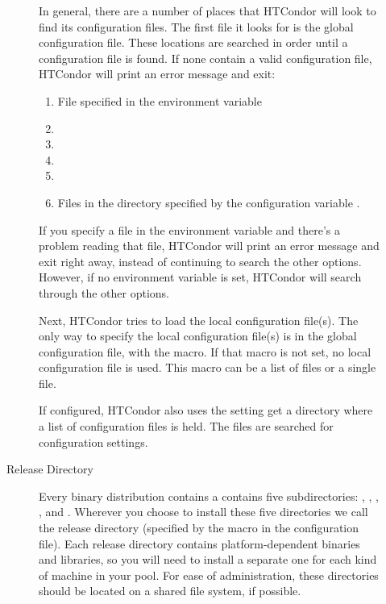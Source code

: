 \begin{description}
\begin{description}
In general, there are a number of places that HTCondor will look to find
its configuration files.  The first file it looks for is the global configuration
file.  These locations are searched in order until a configuration file is
found.  If none contain a valid configuration file, HTCondor will print an
error message and exit:
\begin{enumerate}
   \item File specified in the  environment variable
   \item {}
   \item {}
   \item {}
   \item {}
   \item Files in the directory specified by the configuration variable 
.
\end{enumerate}

If you specify a file in the  environment variable
and there's a problem reading that file, HTCondor will print an error
message and exit right away, instead of continuing to search the other
options.
However, if no  environment variable is set,
HTCondor will search through the other options.

Next, HTCondor tries to load the local configuration file(s).
The only way to specify the local configuration file(s) is in the global configuration
file, with the  macro.  If that macro is not
set, no local configuration file is used.  This macro can be a list of files
or a single file.

If configured, HTCondor also uses the  setting get a
directory where a list of configuration files is held.  The files are searched
for configuration settings.

\item[Release Directory]

Every binary distribution contains a contains
five subdirectories: , , , ,
and . Wherever you
choose to install these five directories we call the release directory
(specified by the  macro in the configuration file).
Each
release directory contains platform-dependent binaries and libraries,
so you will need to install a separate one for each kind of machine in
your pool.  For ease of administration, these directories should be
located on a shared file system, if possible.


\end{description}
\end{description}
